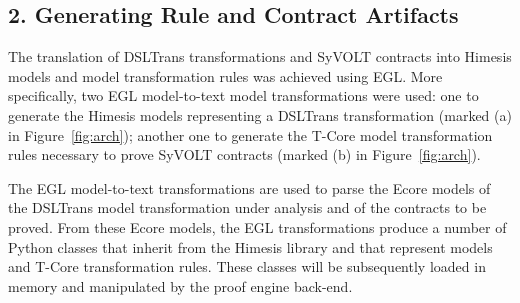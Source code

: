 \subsection*{2. Generating Rule and Contract Artifacts}
\label{sec:gen_models_mt}

The translation of DSLTrans transformations and SyVOLT contracts into Himesis
models and model transformation rules was achieved using EGL. More specifically, two EGL model-to-text model
transformations were used: one to generate the Himesis models
representing a DSLTrans transformation (marked (a) in Figure~\ref{fig:arch});
another one to generate the T-Core model transformation rules necessary to prove
SyVOLT contracts (marked (b) in Figure~\ref{fig:arch}).

The EGL model-to-text transformations are used to parse the Ecore models of the
DSLTrans model transformation under analysis and of the contracts to be proved.
From these Ecore models, the EGL transformations produce a number of Python
classes that inherit from the Himesis library and that
represent models and T-Core transformation rules. These classes will be
subsequently loaded in memory and manipulated by the proof engine back-end.


